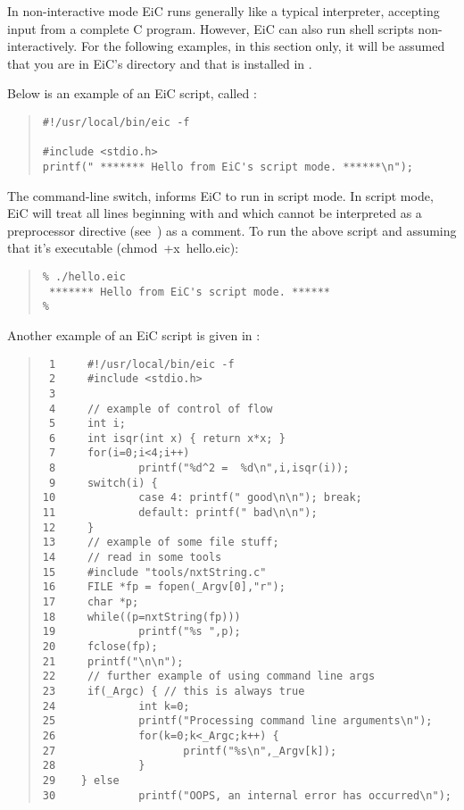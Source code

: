 In non-interactive mode EiC runs generally like a typical
interpreter, accepting input from a complete C program. However, EiC
can also run shell scripts non-interactively. For the following
examples, in this section only, it will be assumed that you are in
EiC's directory  and that
 is installed in .

Below is an example of an EiC script, called :
\begin{quote} 
\begin{verbatim}
#!/usr/local/bin/eic -f

#include <stdio.h>
printf(" ******* Hello from EiC's script mode. ******\n");
\end{verbatim}
\end{quote}
The  command-line switch, informs
EiC to run in script mode.  In script mode, EiC will treat all lines
beginning with \T{\#} and which cannot be interpreted as a
preprocessor directive (see~) as a comment. To
run the above script and assuming that it's executable
(chmod~+x~hello.eic):

\begin{quote}
\begin{verbatim}
% ./hello.eic
 ******* Hello from EiC's script mode. ******
%
\end{verbatim}
\end{quote}

Another example of an EiC script is given in :

\begin{quote} 
\begin{verbatim}
 1     #!/usr/local/bin/eic -f 
 2     #include <stdio.h>
 3
 4     // example of control of flow
 5     int i;
 6     int isqr(int x) { return x*x; }
 7     for(i=0;i<4;i++)
 8             printf("%d^2 =  %d\n",i,isqr(i));
 9     switch(i) {
10             case 4: printf(" good\n\n"); break;
11             default: printf(" bad\n\n");
12     }
13     // example of some file stuff;
14     // read in some tools
15     #include "tools/nxtString.c"
16     FILE *fp = fopen(_Argv[0],"r");
17     char *p;
18     while((p=nxtString(fp)))
19             printf("%s ",p);
20     fclose(fp);
21     printf("\n\n");
22     // further example of using command line args
23     if(_Argc) { // this is always true
24             int k=0;
25             printf("Processing command line arguments\n");
26             for(k=0;k<_Argc;k++) {
27                    printf("%s\n",_Argv[k]);
28             }
29    } else
30             printf("OOPS, an internal error has occurred\n");
\end{verbatim}
\end{quote}

